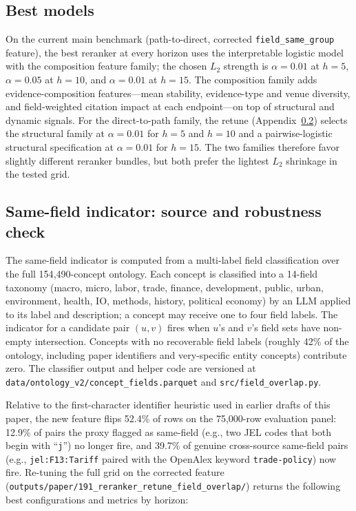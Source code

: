 \documentclass[11pt]{article}
\begin{document}
\subsection{Best models}

On the current main benchmark (path-to-direct, corrected \texttt{field\_same\_group} feature), the best reranker at every horizon uses the interpretable logistic model with the composition feature family; the chosen $L_2$ strength is $\alpha=0.01$ at $h=5$, $\alpha=0.05$ at $h=10$, and $\alpha=0.01$ at $h=15$. The composition family adds evidence-composition features---mean stability, evidence-type and venue diversity, and field-weighted citation impact at each endpoint---on top of structural and dynamic signals. For the direct-to-path family, the retune (Appendix~\ref{app:field-overlap}) selects the structural family at $\alpha=0.01$ for $h=5$ and $h=10$ and a pairwise-logistic structural specification at $\alpha=0.01$ for $h=15$. The two families therefore favor slightly different reranker bundles, but both prefer the lightest $L_2$ shrinkage in the tested grid.

\subsection{Same-field indicator: source and robustness check}
\label{app:field-overlap}

The same-field indicator is computed from a multi-label field classification over the full 154{,}490-concept ontology. Each concept is classified into a 14-field taxonomy (macro, micro, labor, trade, finance, development, public, urban, environment, health, IO, methods, history, political economy) by an LLM applied to its label and description; a concept may receive one to four field labels. The indicator for a candidate pair $(u, v)$ fires when $u$'s and $v$'s field sets have non-empty intersection. Concepts with no recoverable field labels (roughly 42\% of the ontology, including paper identifiers and very-specific entity concepts) contribute zero. The classifier output and helper code are versioned at \texttt{data/ontology\_v2/concept\_fields.parquet} and \texttt{src/field\_overlap.py}.

Relative to the first-character identifier heuristic used in earlier drafts of this paper, the new feature flips 52.4\% of rows on the 75{,}000-row evaluation panel: 12.9\% of pairs the proxy flagged as same-field (e.g., two JEL codes that both begin with ``\texttt{j}'') no longer fire, and 39.7\% of genuine cross-source same-field pairs (e.g., \texttt{jel:F13:Tariff} paired with the OpenAlex keyword \texttt{trade-policy}) now fire. Re-tuning the full grid on the corrected feature (\texttt{outputs/paper/191\_reranker\_retune\_field\_overlap/}) returns the following best configurations and metrics by horizon:
\end{document}

